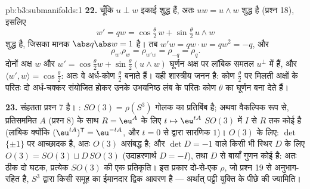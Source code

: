 \begin{solution}{pb:b3:submanifolds:1}
\textbf{22.} चूँकि $u \perp w$ इकाई शुद्ध हैं, अतः $uw =
u\wedge w$ शुद्ध है (प्रश्न
18), इसलिए
\[
w' = qw = \cos\tfrac\theta2\,w + \sin\tfrac\theta2\,u\wedge
w
\]
शुद्ध है, जिसका मानक $\abs q\abs w = 1$ है। तब $w'w = qw\cdot w
= qw^2 = -q$, और
\[
\rho_{w'}\rho_w = \rho_{w'w} = \rho_{-q} = \rho_q .
\]
दोनों अक्ष $w$ और $w' = \cos\frac\theta2 w +
\sin\frac\theta2(u\wedge w)$ घूर्णन अक्ष पर लांबिक समतल $u^\perp$ में हैं,
और $\langle w', w\rangle
= \cos\frac\theta2$: अतः वे अर्ध-कोण $\frac\theta2$ बनाते हैं। यही शास्त्रीय जनन है:
कोण $\frac\theta2$ पर मिलती अक्षों के परितः दो अर्ध-चक्कर संयोजित होकर उनके
उभयनिष्ठ लंब के परितः कोण $\theta$ का घूर्णन बना देते हैं।

\textbf{23.} संहतता प्रश्न 7 है। : $SO(3) = \rho(S^3)$  गोलक
का  प्रतिबिंब है; अथवा वैकल्पिक रूप से, प्रतिसममित $A$ (प्रश्न
8) के साथ $R = \eu^{A}$ के लिए $t \mapsto \eu^{tA}$ $SO(3)$ में $I$ से $R$ तक कोई  है
(लांबिक क्योंकि $(\eu^{tA})^{\mathsf T} = \eu^{-tA}$, और $t = 0$ से  द्वारा सारणिक $1$)।
$O(3)$ के लिए: $\det$ $\{\pm1\}$ पर  आच्छादक है, अतः $O(3)$ असंबद्ध है;
और $\det D = -1$ वाले किसी भी स्थिर $D$ के लिए $O(3) = SO(3)
\sqcup D\,SO(3)$ (उदाहरणार्थ $D = -I$),
तथा $D$ से बायाँ गुणन कोई  है: अतः ठीक दो घटक, प्रत्येक
$SO(3)$ की एक प्रतिकृति। इस प्रकार दो-से-एक $\rho$, जो प्रश्न 19 से
अनुभाग-रहित है,  $S^3$ द्वारा किसी   समूह का
ईमानदार द्विक आवरण है --- अर्थात् पट्टी युक्ति के पीछे की ज्यामिति।


\end{solution}
